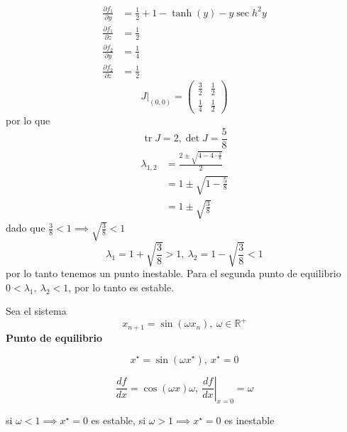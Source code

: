 \begin{ejemplo}
	\begin{equation*}
		\begin{split}
			\frac{\partial f_1}{\partial y} &= \frac{1}{2}+1-\tanh(y)-y \sec h^2 y \\
			\frac{\partial f_1}{\partial z} &=\frac{1}{2} \\
			\frac{\partial f_2}{\partial y} &=\frac{1}{4}\\
			\frac{\partial f_2}{\partial z}&=\frac{1}{2} 
		\end{split}
	\end{equation*}
	\begin{equation*}
	  \left. J \right|_{(0,0)} = \begin{pmatrix} \frac{3}{2} & \frac{1}{2} \\ \frac{1}{4} & \frac{1}{2} \end{pmatrix}  
	\end{equation*}
	por lo que
	\begin{equation*}
	  \operatorname{tr}J=2, \operatorname{det}J=\frac{5}{8} 
	\end{equation*}
	\begin{align*}
	  \lambda_{1,2} &= \frac{2\pm \sqrt{4-4\cdot \frac{5}{8}}}{2} \\
									&= 1 \pm \sqrt{1-\frac{5}{8}} \\
									&= 1 \pm \sqrt{\frac{3}{8}}
	\end{align*}
	dado que $\frac{3}{8}<1 \implies \sqrt{\frac{3}{8}}<1$
	\begin{equation*}
	   \lambda_1=1+\sqrt{\frac{3}{8}}>1,\ \lambda_2 = 1-\sqrt{\frac{3}{8}}<1
	\end{equation*}
	por lo tanto tenemos un punto inestable. Para el segunda punto de equilibrio $0<\lambda_1,\ \lambda_2<1$, por lo tanto es estable.
	
\end{ejemplo}

\begin{ejemplo}Sea el sistema
	\begin{equation*}
	  x_{n+1}= \sin(\omega x_n),\ \omega \in \mathbb{R}^{+} 
	\end{equation*}
	\textbf{Punto de equilibrio}

	\begin{equation*}
	  x^{\star}=\sin(\omega x^{\star}),\ x^{\star}=0 
	\end{equation*}

	\begin{equation*}
	  \frac{df}{dx} = \cos(\omega x)\omega ,\ \left. \frac{df}{dx} \right|_{x=0}=\omega 
	\end{equation*}

	si $\omega<1 \implies x^{\star}=0$ es estable, si $\omega>1 \implies x^{\star}=0$ es inestable
\end{ejemplo}
